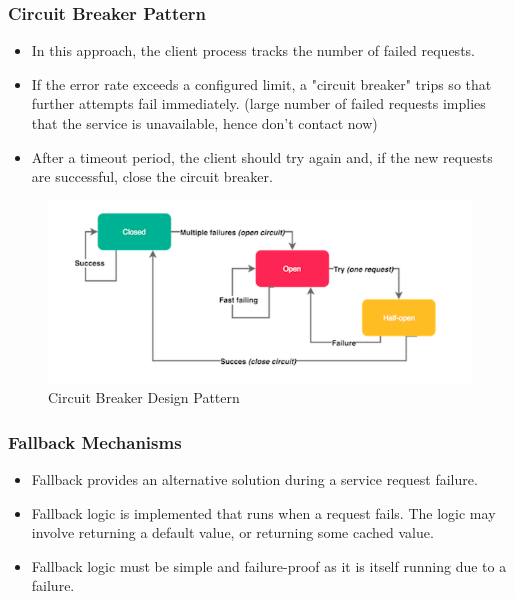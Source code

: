 \documentclass{article}
\begin{document}
\subsubsection{Circuit Breaker Pattern}
\begin{itemize}
    \item In this approach, the client process tracks the number of failed requests. 
    
    \item If the error rate exceeds a configured limit, a "circuit breaker" trips so that further attempts fail immediately. (large number of failed requests implies that the service is unavailable, hence don't contact now)
    
    \item After a timeout period, the client should try again and, if the new requests are successful, close the circuit breaker.
\end{itemize}

\begin{figure}[!ht]
    \centering
    \includegraphics[scale=0.5]{ckt_break.png}
    \caption{Circuit Breaker Design Pattern}
    \label{fig:my_label_4761}
\end{figure}

\subsubsection{Fallback Mechanisms}
\begin{itemize}
    \item Fallback provides an alternative solution during a service request failure. 
    
    \item Fallback logic is implemented that runs when a request fails. The logic may involve returning a default value, or returning some cached value.
    
    \item Fallback logic must be simple and failure-proof as it is itself running due to a failure. 
\end{itemize}
\end{document}
